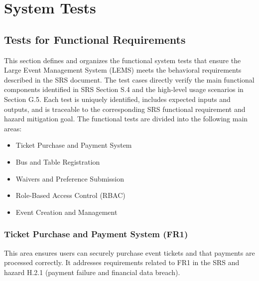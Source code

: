 \documentclass[12pt, titlepage]{article}
\begin{document}


\section{System Tests}


\subsection{Tests for Functional Requirements}

This section defines and organizes the functional system tests that ensure the Large Event Management System (LEMS) meets the behavioral requirements described in the SRS document. The test cases directly verify the main functional components identified in SRS Section S.4 and the high-level usage scenarios in Section G.5.  
Each test is uniquely identified, includes expected inputs and outputs, and is traceable to the corresponding SRS functional requirement and hazard mitigation goal.\newline \newline
The functional tests are divided into the following main areas:
\begin{itemize}
    \item Ticket Purchase and Payment System
    \item Bus and Table Registration
    \item Waivers and Preference Submission
    \item Role-Based Access Control (RBAC)
    \item Event Creation and Management
\end{itemize}

\subsubsection{Ticket Purchase and Payment System (FR1)}

This area ensures users can securely purchase event tickets and that payments are processed correctly. It addresses requirements related to FR1 in the SRS and hazard H.2.1 (payment failure and financial data breach).
\end{document}
